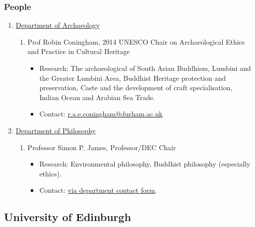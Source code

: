 \documentclass[a4paper,10.5pt]{article}
\begin{document}
\subsubsection{People}
\label{sec:org3022d53}
\begin{enumerate}
\item \href{https://www.durham.ac.uk/departments/academic/archaeology/}{Department of Archaeology}
\label{sec:org05b3005}
\begin{enumerate}
\item Prof Robin Coningham, 2014 UNESCO Chair on Archaeological Ethics and Practice in Cultural Heritage
\label{sec:orge7cf3fe}
\begin{itemize}
\item Research: The archaeological of South Asian Buddhism, Lumbini and the Greater Lumbini Area, Buddhist Heritage protection and preservation, Caste and the development of craft specialisation, Indian Ocean and Arabian Sea Trade.\\
\item Contact: \href{mailto:r.a.e.coningham@durham.ac.uk}{r.a.e.coningham@durham.ac.uk}\\
\end{itemize}
\end{enumerate}
\item \href{https://www.durham.ac.uk/departments/academic/philosophy/contact-us/}{Department of Philosophy}
\label{sec:orgd9f7f5a}
\begin{enumerate}
\item Professor Simon P. James, Professor/DEC Chair
\label{sec:orgcc519ed}
\begin{itemize}
\item Research: Environmental philosophy, Buddhist philosophy (especially ethics).\\
\item Contact: \href{https://www.durham.ac.uk/departments/academic/philosophy/contact-us/}{via department contact form}.\\
\end{itemize}
\end{enumerate}
\end{enumerate}

\subsection{University of Edinburgh}
\label{sec:orgc774e43}
\end{document}

